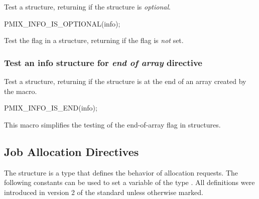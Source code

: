\summary

Test a  structure, returning  if the structure is \textit{optional}.

\cspecificstart
\begin{codepar}
PMIX_INFO_IS_OPTIONAL(info);
\end{codepar}
\cspecificend

\begin{arglist}
\end{arglist}

Test the  flag in a  structure, returning  if the flag is \textit{not} set.

\subsubsection{Test an info structure for \textit{end of array} directive}

\summary

Test a  structure, returning  if the structure is at the end of an array created by the  macro.

\cspecificstart
\begin{codepar}
PMIX_INFO_IS_END(info);
\end{codepar}
\cspecificend

\begin{arglist}
\end{arglist}

This macro simplifies the testing of the end-of-array flag in  structures.

\subsection{Job Allocation Directives}

The  structure is a  type that defines the behavior of allocation requests.
The following constants can be used to set a variable of the type . All definitions were introduced in version 2 of the standard unless otherwise marked.

